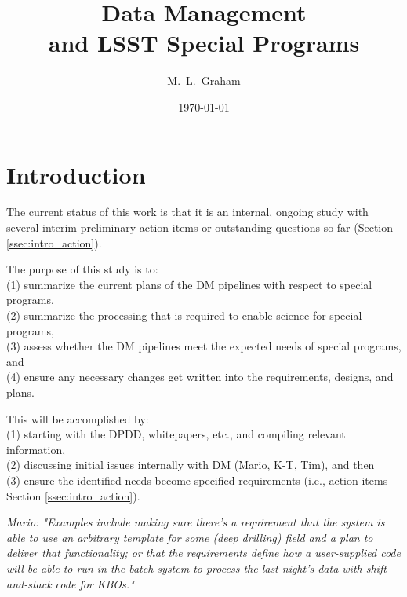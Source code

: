 \documentclass[DM,lsstdraft,toc]{lsstdoc}
\title[LSST Special Programs]{Data Management \\ and LSST Special Programs}
\author{M.~L.~Graham}
\date{\today}
\begin{document}
\maketitle




\section{Introduction} \label{sec:intro}

\noindent The current status of this work is that it is an internal, ongoing study with several interim preliminary action items or outstanding questions so far (Section \ref{ssec:intro_action}).

\noindent The purpose of this study is to: \\
(1) summarize the current plans of the DM pipelines with respect to special programs, \\
(2) summarize the processing that is required to enable science for special programs, \\
(3) assess whether the DM pipelines meet the expected needs of special programs, and \\
(4) ensure any necessary changes get written into the requirements, designs, and plans.

\noindent This will be accomplished by: \\
(1) starting with the DPDD, whitepapers, etc., and compiling relevant information, \\
(2) discussing initial issues internally with DM (Mario, K-T, Tim), and then \\
(3) ensure the identified needs become specified requirements (i.e., action items Section \ref{ssec:intro_action}).

{\it Mario: "Examples include making sure there's a requirement that the system is able to use an arbitrary template for some (deep drilling) field and a plan to deliver that functionality; or that the requirements define how a user-supplied code will be able to run in the batch system to process the last-night's data with shift-and-stack code for KBOs."}
\end{document}
